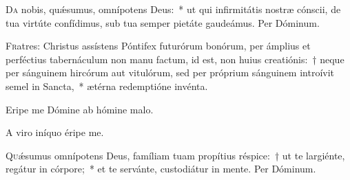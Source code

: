 \documentclass[vesperale_romanum.tex]{subfiles}
\begin{document}
\oratio

\lettrine{D}{a}  nobis, quǽsumus, omnípotens Deus:~* ut qui infirmitátis nostræ cónscii, de tua virtúte confídimus, sub tua semper pietáte gaudeámus.
Per Dóminum.



\lettrine{F}{r}atres: Christus assístens Póntifex futurórum bonórum, per ámplius et perféctius tabernáculum non manu factum, id est, non huius creatiónis:~† neque per sánguinem hircórum aut vitulórum, sed per próprium sánguinem introívit semel in Sancta,~* ætérna redemptióne invénta.

\hymnus \label{vexilla_regis_passionis}%


\vv Eripe me Dómine ab hómine malo.\label{vv_passionis}

\rr A viro iníquo éripe me.


\oratio

\lettrine[depth=1]{Q}{u}ǽsumus omnípotens Deus, famíliam tuam propítius réspice:~† ut te largiénte, regátur in córpore;~* et te servánte, custodiátur in mente. Per Dóminum. %


\hymnusadcompletorium
\label{hy_te_lucis_ante_terminum_passiontide_solesmes_1961}




\end{document}
